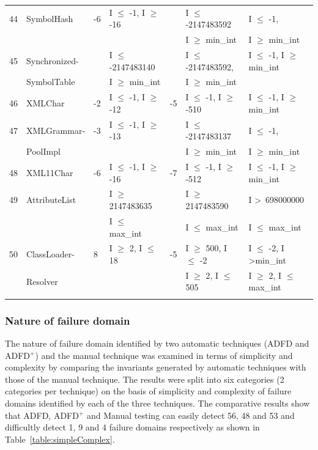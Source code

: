 {\begin{longtable}{|l|l|l|l|l|l|l|}
	\hline
44	& SymbolHash				&-6 & I $\le$ -1,  I $\ge$ -16		&	& I $\le$ -2147483592			& I $\le$ -1, 							\\ 
	&							&&								&& I $\ge$ min\_int				& I $\ge$ min\_int				\\
	\hline
45	& Synchronized-				&& I $\le$ -2147483140			&& I $\le$ -2147483592,			& I $\le$ -1, I $\ge$ min\_int	\\ 
	& SymbolTable                       	&& I $\ge$ min\_int				&& I $\ge$ min\_int	 			&  			   								\\
	\hline
46	& XMLChar					&-2 & I $\le$ -1, I $\ge$ -12		&-5 & I $\le$ -1, I $\ge$ -510			& I $\le$ -1, I $\ge$ min\_int	\\
	\hline
47	& XMLGrammar- 				&-3 & I $\le$ -1, I $\ge$ -13		&	& I $\le$ -2147483137 			& I $\le$ -1, 							\\ 
	& PoolImpl					&&								&& I $\ge$ min\_int				& I $\ge$ min\_int				\\
	\hline
48	& XML11Char				&-6 & I $\le$ -1, I $\ge$ -16		&-7 & I $\le$ -1, I $\ge$ -512			& I $\le$ -1, I $\ge$ min\_int	\\ 
	\hline
49	& AttributeList				&& I $\ge$ 2147483635			&& I $\ge$ 2147483590			& I \textgreater~698000000					\\ 
	&                                             && I $\le$ max\_int				&& I $\le$ max\_int				& I $\le$ max\_int				\\
	\hline
50	& ClassLoader-				&8& I $\ge$ 2, I $\le$ 18			&-5 & I $\ge$ 500, I $\le$ -2			& I $\le$ -2, I \textgreater min\_int  	\\ 
	& Resolver					&& 								&	& I $\ge$ 2, I $\le$ 505			& I $\ge$ 2, I $\le$ max\_int	\\ 
	& \label{table:stripDomains7}	&&								&&								&		\\\hline
\end{longtable}
}




\subsubsection{Nature of failure domain} \label{sec:nature}
The nature of failure domain identified by two automatic techniques (ADFD and ADFD$^+$) and the manual technique was examined in terms of simplicity and complexity by comparing the invariants generated by automatic techniques with those of the manual technique. The results were split into six categories (2 categories per technique) on the basis of simplicity and complexity of failure domains identified by each of the three techniques. The comparative results show that ADFD, ADFD$^+$ and Manual testing can easily detect 56, 48 and 53 and difficultly detect 1, 9 and 4 failure domains respectively as shown in Table~\ref{table:simpleComplex}.


